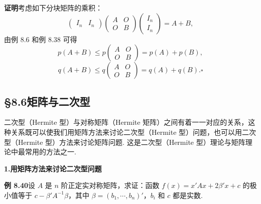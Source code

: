 \documentclass[UTF8, 12pt, fontset=fandol, oneside]{ctexart}
\begin{document}
\noindent\textbf{证明}\quad 考虑如下分块矩阵的乘积：
\[
\left(\begin{array}{cc}I_n&I_n\end{array}\right)
\left(\begin{array}{cc}
A & O\\
O & B
\end{array}\right)
\left(\begin{array}{c}
I_n\\
I_n
\end{array}\right)=A+B,
\]
由例 8.6 和例 8.38 可得
\[
p(A+B)\le p\left(\begin{array}{cc}A&O\\ O&B\end{array}\right)=p(A)+p(B),
\]
\[
q(A+B)\le q\left(\begin{array}{cc}A&O\\ O&B\end{array}\right)=q(A)+q(B). \ensuremath{\square}
\]

\subsection*{§8.6\quad 矩阵与二次型}

二次型（Hermite 型）与对称矩阵（Hermite 矩阵）之间有着一一对应的关系，这种关系既可以使我们用矩阵方法来讨论二次型（Hermite 型）问题，也可以用二次型（Hermite 型）方法来讨论矩阵问题. 这是二次型（Hermite 型）理论与矩阵理论中最常用的方法之一.

\noindent\textbf{1.\quad 用矩阵方法来讨论二次型问题}

\noindent\textbf{例 8.40}\quad 设 $A$ 是 $n$ 阶正定实对称矩阵，求证：函数 $f(x)=x'Ax+2\beta'x+c$ 的极小值等于 $c-\beta'A^{-1}\beta$，其中 $\beta=(b_1,\cdots,b_n)'$，$b_i$ 和 $c$ 都是实数.
\end{document}
